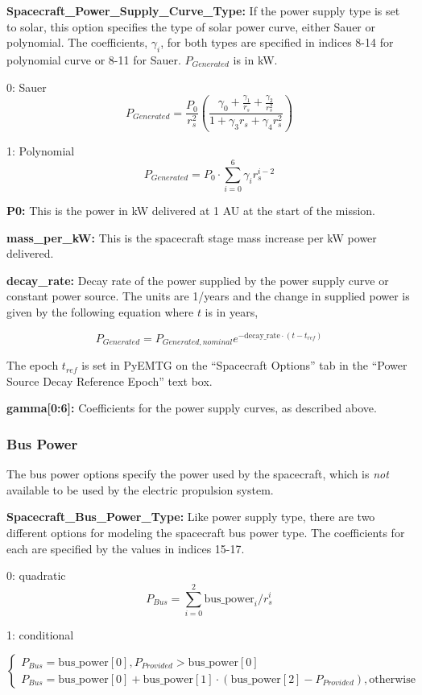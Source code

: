 \documentclass[11pt]{article}
\begin{document}
\noindent \textbf{Spacecraft\_Power\_Supply\_Curve\_Type:} If the power supply type is set to solar, this option specifies the type of solar power curve, either Sauer or polynomial. The coefficients, \(\gamma_i\), for both types are specified in indices 8-14 for polynomial curve or 8-11 for Sauer. \(P_{Generated}\) is in kW.

0: Sauer \[ P_{Generated}=\frac{P_0}{r_s^2}\left(\frac{\gamma_0+\frac{\gamma_1}{r_s}+\frac{\gamma_2}{r_s^2}}{1+\gamma_3r_s+\gamma_4r_s^2}\right) \]

1: Polynomial \[ P_{Generated}=P_0\cdot\sum_{i=0}^6\gamma_ir_s^{i-2} \]

\noindent \textbf{P0:} This is the power in kW delivered at 1 \acs{AU} at the start of the mission.

\noindent \textbf{mass\_per\_kW:} This is the spacecraft stage mass increase per kW power delivered.

\noindent \textbf{decay\_rate:} Decay rate of the power supplied by the power supply curve or constant power source. The units are 1/years and the change in supplied power is given by the following equation where \(t\) is in years,

\[ P_{Generated} = P_{Generated,nominal}e^{-\mathrm{decay\_rate}\cdot (t-t_{ref})} \]

\noindent The epoch \(t_{ref}\) is set in PyEMTG on the ``Spacecraft Options'' tab in the ``Power Source Decay Reference Epoch'' text box.

\noindent \textbf{gamma[0:6]:} Coefficients for the power supply curves, as described above.

\subsubsection{Bus Power}
\label{sec:bus_power}

The bus power options specify the power used by the spacecraft, which is \textit{not} available to be used by the electric propulsion system.

\noindent \textbf{Spacecraft\_Bus\_Power\_Type:} Like power supply type, there are two different options for modeling the spacecraft bus power type. The coefficients for each are specified by the values in indices 15-17.

0: quadratic \[ P_{Bus} = \sum_{i=0}^2 \mathrm{bus\_power}_i / r_s^i \]

1: conditional 

\[ \left\{ \begin{array}{l} P_{Bus} = \mathrm{bus\_power[0]},  P_{Provided} > \mathrm{bus\_power[0]} \\ P_{Bus} = \mathrm{bus\_power[0]} + \mathrm{bus\_power[1]} \cdot \left(\mathrm{bus\_power[2]} - P_{Provided}\right), \mathrm{otherwise} \end{array} \right. \]
\end{document}
